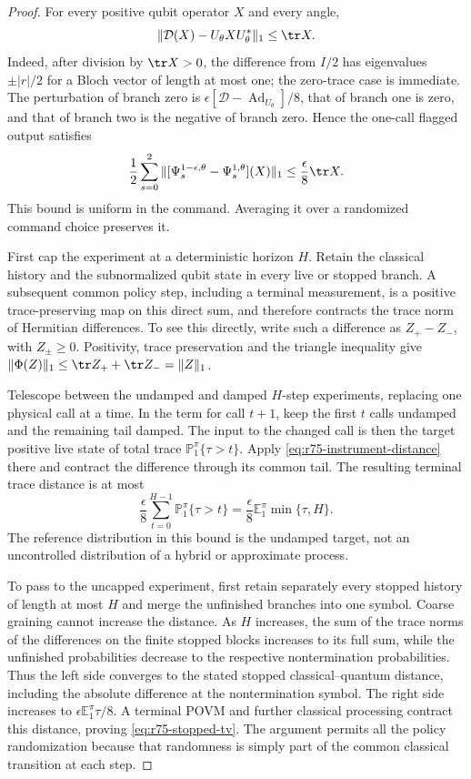 \begin{proof}
For every positive qubit operator $X$ and every angle,
\[
 \|\mathcal D(X)-U_\theta XU_\theta^*\|_1\le\tr X.
\]
Indeed, after division by $\tr X>0$, the difference from $I/2$ has
eigenvalues $\pm |r|/2$ for a Bloch vector of length at most one; the
zero-trace case is immediate.  The perturbation of branch zero is
$\epsilon[\mathcal D-\operatorname{Ad}_{U_\theta}]/8$, that of branch one
is zero, and that of branch two is the negative of branch zero.  Hence
the one-call flagged output satisfies
\begin{equation}\label{eq:r75-instrument-distance}
 \frac12\sum_{s=0}^2
   \|[\Psi_s^{1-\epsilon,\theta}-\Psi_s^{1,\theta}](X)\|_1
 \le\frac\epsilon8\tr X.
\end{equation}
This bound is uniform in the command.  Averaging it over a randomized
command choice preserves it.

First cap the experiment at a deterministic horizon $H$.  Retain the
classical history and the subnormalized qubit state in every live or
stopped branch.  A subsequent common policy step, including a terminal
measurement, is a positive trace-preserving map on this direct sum, and
therefore contracts the trace norm of Hermitian differences.  To see
this directly, write such a difference as $Z_+-Z_-$, with
$Z_\pm\ge0$.  Positivity, trace preservation and the triangle inequality
give $\|\Phi(Z)\|_1\le\tr Z_++\tr Z_-=\|Z\|_1$.

Telescope between the undamped and damped $H$-step experiments, replacing
one physical call at a time.  In the term for call $t+1$, keep the first
$t$ calls undamped and the remaining tail damped.  The input to the
changed call is then the target positive live state of total trace
$\mathbb P_1^\pi\{\tau>t\}$.  Apply
\eqref{eq:r75-instrument-distance} there and contract the difference
through its common tail.  The resulting terminal trace distance is at
most
\begin{equation}\label{eq:r75-capped-distance}
 \frac\epsilon8\sum_{t=0}^{H-1}
      \mathbb P_1^\pi\{\tau>t\}
 =\frac\epsilon8\mathbb E_1^\pi\min\{\tau,H\}.
\end{equation}
The reference distribution in this bound is the undamped target, not an
uncontrolled distribution of a hybrid or approximate process.

To pass to the uncapped experiment, first retain separately every stopped
history of length at most $H$ and merge the unfinished branches into one
symbol.  Coarse graining cannot increase the distance.  As $H$ increases,
the sum of the trace norms of the differences on the finite stopped
blocks increases to its full sum, while the unfinished probabilities
decrease to the respective nontermination probabilities.  Thus the
left side converges to the stated stopped classical--quantum distance,
including the absolute difference at the nontermination symbol.  The
right side increases to $\epsilon\mathbb E_1^\pi\tau/8$.  A terminal
POVM and further classical processing contract this distance, proving
\eqref{eq:r75-stopped-tv}.  The argument permits all the policy
randomization because that randomness is simply part of the common
classical transition at each step.


\end{proof}
